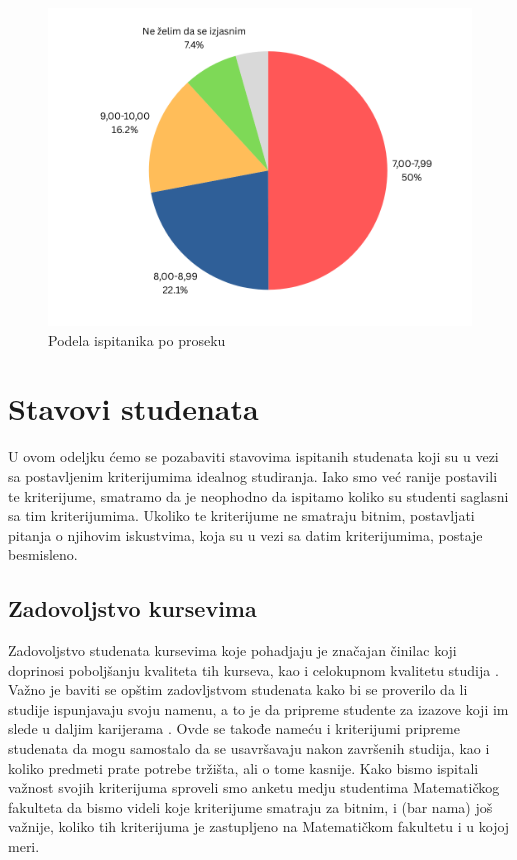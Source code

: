 \documentclass[a4paper]{article}
\begin{document}
{\begin{figure}[H]
    \centering
    \includegraphics[width=0.7\linewidth]{prosek.png}
    \caption{Podela ispitanika po proseku}
    \label{fig:raspodela_prosek}
\end{figure}





\section{Stavovi studenata}
\label{sec:stavovi}


U ovom odeljku ćemo se pozabaviti stavovima ispitanih studenata koji su u vezi sa postavljenim kriterijumima idealnog studiranja. Iako smo već ranije postavili te kriterijume, smatramo da je neophodno da ispitamo koliko su studenti saglasni sa tim kriterijumima. Ukoliko te kriterijume ne smatraju bitnim, postavljati pitanja o njihovim iskustvima, koja su u vezi sa datim kriterijumima, postaje besmisleno.


\subsection{Zadovoljstvo kursevima}
\label{subsec:zadovoljstvo_stavovi}

Zadovoljstvo studenata kursevima koje pohadjaju je značajan činilac koji doprinosi poboljšanju kvaliteta tih kurseva, kao i celokupnom kvalitetu studija \cite{satisfaction}. Važno je baviti se opštim zadovljstvom studenata kako bi se proverilo da li studije ispunjavaju svoju namenu, a to je da pripreme studente za izazove koji im slede u daljim karijerama \cite{education}. Ovde se takođe nameću i kriterijumi pripreme studenata da mogu samostalo da se usavršavaju nakon završenih studija, kao i koliko predmeti prate potrebe tržišta, ali o tome kasnije.
Kako bismo ispitali važnost svojih kriterijuma sproveli smo anketu medju studentima Matematičkog fakulteta da bismo videli koje kriterijume smatraju za bitnim, i (bar nama) još važnije, koliko tih kriterijuma je zastupljeno na Matematičkom fakultetu i u kojoj meri.

}
\end{document}
